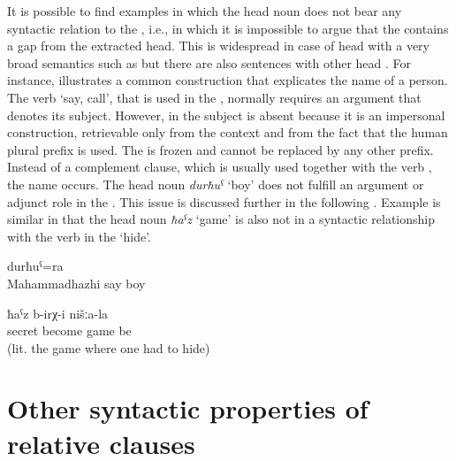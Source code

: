 It is possible to find examples in which the head noun does not bear any syntactic relation to the , i.e., in which it is impossible to argue that the  contains a gap from the extracted head. This is widespread in case of head  with a very broad semantics such as   but there are also sentences with other head . For instance,  illustrates a common construction that explicates the name of a person. The verb  `say, call', that is used in the , normally requires an  argument that denotes its subject. However, in  the subject is absent because it is an impersonal construction, retrievable only from the context and from the fact that the human plural  prefix is used. The   is frozen and cannot be replaced by any other prefix. Instead of a complement clause, which is usually used together with the verb  , the name  occurs. The head noun \textit{durħuˁ} `boy' does not fulfill an argument or adjunct role in the . This issue is discussed further in the following . Example  is similar in that the head noun \textit{ħaˁz} `game' is also not in a syntactic relationship with the verb in the  `hide'.
%
\begin{exe}
	\ex	\label{ex:the boy called Mahammadhazhi}
	\gll	[Maħaˁmmadħaˁži	b-ik'ʷ-an]	durħuˁ=ra\\
		Mahammadhazhi	say	boy\\
	\glt	{}

	\ex	\label{ex:There was this game of ours, the hide-and-seek}
		ħaˁz	b-irχ-i	nišːa-la\\
		secret	become	game	be	\\
	\glt	{} (lit. the game where one had to hide)
\end{exe}



\section{Other syntactic properties of relative clauses}
\label{sec:Other syntactic properties of relative clauses}

